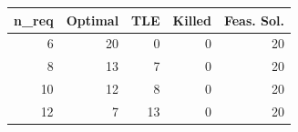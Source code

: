 
\begin{tabular}{rrrrr}
\toprule
n\_req & Optimal & TLE & Killed & Feas. Sol.\\
\midrule
6 & 20 & 0 & 0 & 20\\
8 & 13 & 7 & 0 & 20\\
10 & 12 & 8 & 0 & 20\\
12 & 7 & 13 & 0 & 20\\
\bottomrule
\end{tabular}
